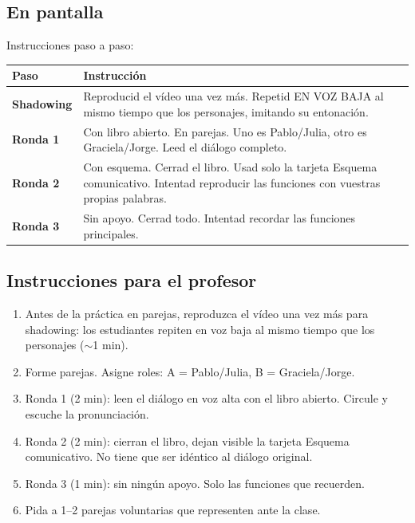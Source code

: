 \documentclass[a4paper,11pt]{article}
\begin{document}
\subsection*{En pantalla}

Instrucciones paso a paso:

\vspace{0.3cm}

\begin{center}
\renewcommand{\arraystretch}{1.8}
\begin{tabular}{|>{\centering\arraybackslash}p{2.5cm}|>{\raggedright\arraybackslash}p{10cm}|}
\hline
\rowcolor{verde!15}
\textbf{Paso} & \textbf{Instrucción} \\
\hline
\textbf{Shadowing} & Reproducid el vídeo una vez más. Repetid EN VOZ BAJA al mismo tiempo que los personajes, imitando su entonación. \\
\hline
\textbf{Ronda 1} & Con libro abierto. En parejas. Uno es Pablo/Julia, otro es Graciela/Jorge. Leed el diálogo completo. \\
\hline
\textbf{Ronda 2} & Con esquema. Cerrad el libro. Usad solo la tarjeta Esquema comunicativo. Intentad reproducir las funciones con vuestras propias palabras. \\
\hline
\textbf{Ronda 3} & Sin apoyo. Cerrad todo. Intentad recordar las funciones principales. \\
\hline
\end{tabular}
\end{center}

\vspace{0.5cm}

\subsection*{Instrucciones para el profesor}

\begin{enumerate}[leftmargin=1.5cm, itemsep=4pt]
\item Antes de la práctica en parejas, reproduzca el vídeo una vez más para shadowing: los estudiantes repiten en voz baja al mismo tiempo que los personajes ($\sim$1 min).
\item Forme parejas. Asigne roles: A = Pablo/Julia, B = Graciela/Jorge.
\item Ronda 1 (2 min): leen el diálogo en voz alta con el libro abierto. Circule y escuche la pronunciación.
\item Ronda 2 (2 min): cierran el libro, dejan visible la tarjeta Esquema comunicativo. No tiene que ser idéntico al diálogo original.
\item Ronda 3 (1 min): sin ningún apoyo. Solo las funciones que recuerden.
\item Pida a 1--2 parejas voluntarias que representen ante la clase.
\end{enumerate}
\end{document}
